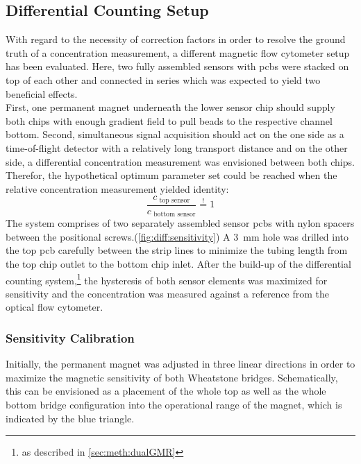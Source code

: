 \subsection{Differential Counting Setup}
\label{sec:res:diffCounting}
With regard to the necessity of correction factors in order to resolve the ground truth of a concentration measurement, a different magnetic flow cytometer setup has been evaluated. Here, two fully assembled sensors with \glspl{pcb} were stacked on top of each other and connected in series which was expected to yield two beneficial effects.\\
First, one permanent magnet underneath the lower sensor chip should supply both chips with enough gradient field to pull beads to the respective channel bottom. Second, simultaneous signal acquisition should act on the one side as a time-of-flight detector with a relatively long transport distance and on the other side, a differential concentration measurement was envisioned between both chips. Therefor, the hypothetical optimum parameter set could be reached when the relative concentration measurement yielded identity:
\begin{equation}
	\dfrac{c_\text{\ top sensor}}{c_\text{\ bottom\ sensor}} \overset{!}{=} 1
	\label{eq:diff:optimum}
\end{equation}
The system comprises of two separately assembled sensor \glspl{pcb} with nylon spacers between the positional screws.(\cref{fig:diff:sensitivity})  A \SI{3}{\milli\meter} hole was drilled into the top \gls{pcb} carefully between the strip lines to minimize the tubing length from the top chip outlet to the bottom chip inlet. 
After the build-up of the differential counting system,\footnote{as described in \cref{sec:meth:dualGMR}} the hysteresis of both sensor elements was maximized for sensitivity and the concentration was measured against a reference from the optical flow cytometer. 

\subsubsection{Sensitivity Calibration}
Initially, the permanent magnet was adjusted in three linear directions in order to maximize the magnetic sensitivity of both Wheatstone bridges. Schematically, this can be envisioned as a placement of the whole top as well as the whole bottom bridge configuration into the operational range of the magnet, which is indicated by the blue triangle.

